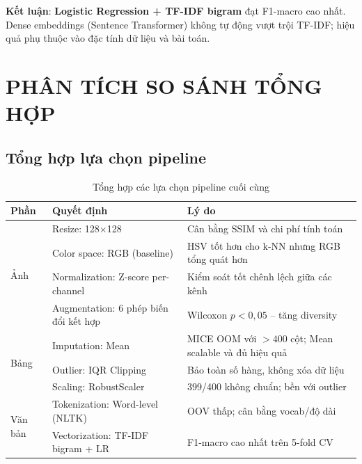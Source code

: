 \documentclass[12pt,a4paper]{article}
\let\oldtextbf\textbf
\renewcommand{\textbf}[1]{\oldtextbf{\textcolor{hcmublue}{#1}}}
\begin{document}
\textbf{Kết luận}: \textbf{Logistic Regression + TF-IDF bigram} đạt F1-macro cao nhất. Dense embeddings (Sentence Transformer) không tự động vượt trội TF-IDF; hiệu quả phụ thuộc vào đặc tính dữ liệu và bài toán.

\section{PHÂN TÍCH SO SÁNH TỔNG HỢP}

\subsection{Tổng hợp lựa chọn pipeline}

\begin{table}[H]
\centering
\begin{tabular}{|l|l|l|}
\hline
\textbf{Phần} & \textbf{Quyết định} & \textbf{Lý do} \\ \hline
\multirow{4}{*}{Ảnh}  & Resize: 128$\times$128 & Cân bằng SSIM và chi phí tính toán \\ \cline{2-3}
                      & Color space: RGB (baseline) & HSV tốt hơn cho k-NN nhưng RGB tổng quát hơn \\ \cline{2-3}
                      & Normalization: Z-score per-channel & Kiểm soát tốt chênh lệch giữa các kênh \\ \cline{2-3}
                      & Augmentation: 6 phép biến đổi kết hợp & Wilcoxon $p < 0{,}05$ -- tăng diversity \\ \hline
\multirow{3}{*}{Bảng} & Imputation: Mean & MICE OOM với $>400$ cột; Mean scalable và đủ hiệu quả \\ \cline{2-3}
                      & Outlier: IQR Clipping & Bảo toàn số hàng, không xóa dữ liệu \\ \cline{2-3}
                      & Scaling: RobustScaler & 399/400 không chuẩn; bền với outlier \\ \hline
\multirow{2}{*}{Văn bản} & Tokenization: Word-level (NLTK) & OOV thấp; cân bằng vocab/độ dài \\ \cline{2-3}
                         & Vectorization: TF-IDF bigram + LR & F1-macro cao nhất trên 5-fold CV \\ \hline
\end{tabular}
\caption{Tổng hợp các lựa chọn pipeline cuối cùng}
\label{tab:pipeline_summary}
\end{table}
\end{document}
